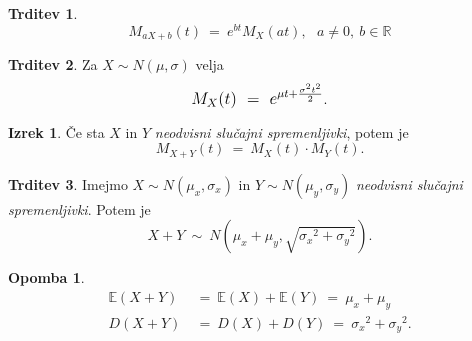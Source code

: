 \documentclass[11pt]{article}
\theoremstyle{definition}
\theoremstyle{definition}
\newtheorem{trditev}{Trditev}[section]
\theoremstyle{definition}
\newtheorem{izrek}{Izrek}[section]
\newtheorem*{opomba}{Opomba}
\begin{document}
\begin{trditev}

$$M_{aX+b}(t) ~=~ e^{bt} M_X(at), ~~~a \neq 0, ~b \in \mathbb{R}$$

\end{trditev}
\vspace{0.5cm}

\begin{trditev}

Za $X \sim N(\mu, \sigma)$ velja
$$\mathlarger{M_X(t) ~=~ e^{\mu t + \frac{\sigma^2 t^2}{2}}}.$$ 

\end{trditev}
\vspace{0.5cm}

\begin{izrek}

Če sta $X$ in $Y$ \textit{neodvisni slučajni spremenljivki}, potem je
$$M_{X+Y}(t) ~=~ M_X(t) \cdot M_Y(t).$$

\end{izrek}
\vspace{0.5cm}

\begin{trditev}

Imejmo $X \sim N(\mu_x, \sigma_x)$ in $Y \sim N(\mu_y, \sigma_y)$ \textit{neodvisni slučajni spremenljivki}. Potem je
$$X + Y ~\sim~ N\left(\mu_x + \mu_y, \sqrt{{\sigma_x}^2 + {\sigma_y}^2}\right).$$

\end{trditev}
\vspace{0.5cm}

\begin{opomba}
\begin{align*}
	\mathbb{E}(X+Y) ~&=~ \mathbb{E}(X) + \mathbb{E}(Y) ~=~ \mu_x + \mu_y \\
	D(X+Y) ~&=~ D(X) + D(Y) ~=~ {\sigma_x}^2 + {\sigma_y}^2.
\end{align*}
\end{opomba}
\vspace{0.5cm}

\end{document}
